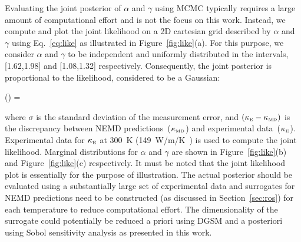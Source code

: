 Evaluating the joint posterior of $\alpha$ and $\gamma$ using MCMC typically requires a large amount of
computational effort and is not the focus on this work. Instead, we compute and plot the joint likelihood on
a 2D cartesian grid described by $\alpha$ and $\gamma$ using Eq.~\ref{eq:like} as illustrated in
Figure~\ref{fig:like}(a). For this purpose, we consider $\alpha$ and $\gamma$ to be
independent and uniformly distributed in the intervals, [1.62,1.98] and [1.08,1.32] respectively. 
Consequently, the joint posterior is proportional to the likelihood, considered to be a Gaussian:

\be
{}(\vert{}) = \exp{}
\label{eq:like}
\ee

\noindent where $\sigma$ is the standard deviation of the measurement error, and
$(\kappa_{\tiny{\mbox{E}}} - \kappa_{\tiny{\mbox{MD}}})$ is the discrepancy between 
NEMD predictions~($\kappa_{\tiny{\mbox{MD}}}$)
and experimental data~($\kappa_{\tiny{\mbox{E}}}$). Experimental data for $\kappa_{\tiny{\mbox{E}}}$ at 300~K
(149~W/m/K~\cite{Shanks:1963}) is used to compute the joint likelihood. Marginal distributions for
$\alpha$ and $\gamma$ are shown in Figure~\ref{fig:like}(b) and Figure~\ref{fig:like}(c) respectively. 
It must be noted that the joint likelihood plot is essentially for the purpose of illustration. The actual posterior
should be evaluated using a substantially large set of experimental data and surrogates for NEMD predictions
need to be constructed (as discussed in Section~\ref{sec:ros}) for each temperature to reduce computational effort. 
The dimensionality of the surrogate could potentially be reduced a priori using DGSM and a posteriori using
Sobol sensitivity analysis as presented in this work. 























